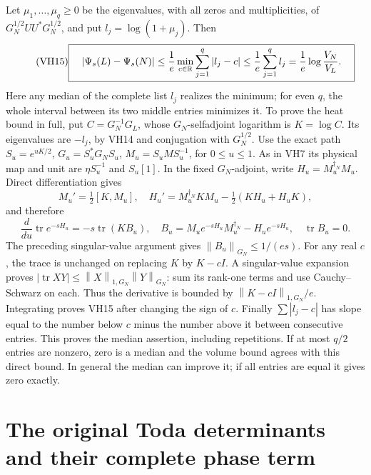 \documentclass[11pt]{article}
\newcommand{\tr}{\operatorname{tr}}\newcommand{\norm}[1]{\left\lVert#1\right\rVert}
\begin{document}
Let \(\mu_1,\ldots,\mu_q\ge0\) be the eigenvalues, with all zeros
and multiplicities, of \(G_N^{1/2}UU^*G_N^{1/2}\), and put
\(l_j=\log(1+\mu_j)\). Then
\begin{equation}\tag{VH15}\label{VH15}
\boxed{\quad
|\Psi_s(L)-\Psi_s(N)|
\le\frac1e\min_{c\in\mathbb R}\sum_{j=1}^q|l_j-c|
\le\frac1e\sum_{j=1}^q l_j
=\frac1e\log\frac{V_N}{V_L}.\quad}
\end{equation}
Here any median of the complete list \(l_j\) realizes the minimum;
for even \(q\), the whole interval between its two middle entries
minimizes it. To prove the heat bound in full, put
\(C=G_N^{-1}G_L\), whose \(G_N\)-selfadjoint logarithm is
\(K=\log C\). Its eigenvalues are \(-l_j\), by VH14 and conjugation
with \(G_N^{1/2}\). Use the exact path
\(S_u=e^{uK/2}\), \(G_u=S_u^*G_NS_u\), \(M_u=S_uMS_u^{-1}\),
for \(0\le u\le1\). As in VH7 its physical map and unit are
\(\eta S_u^{-1}\) and \(S_u[1]\).
In the fixed \(G_N\)-adjoint, write \(H_u=M_u^{\dagger_N}M_u\).
Direct differentiation gives
\[
M_u'=\tfrac12[K,M_u],\quad
H_u'=M_u^{\dagger_N}KM_u-\tfrac12(KH_u+H_uK),
\]
and therefore
\[
\frac d{du}\tr e^{-sH_u}=-s\tr(KB_u),\quad
B_u=M_u e^{-sH_u}M_u^{\dagger_N}-H_u e^{-sH_u},\quad\tr B_u=0.
\]
The preceding singular-value argument gives \(\norm{B_u}_{G_N}\le1/(es)\).
For any real \(c\), the trace is unchanged on replacing \(K\) by
\(K-cI\). A singular-value expansion proves
\(|\tr XY|\le\norm X_{1,G_N}\norm Y_{G_N}\): sum its rank-one terms
and use Cauchy--Schwarz on each. Thus the derivative is bounded by
\(\norm{K-cI}_{1,G_N}/e\). Integrating proves VH15 after changing
the sign of \(c\). Finally \(\sum|l_j-c|\) has slope equal to the
number below \(c\) minus the number above it between consecutive
entries. This proves the median assertion, including repetitions.
If at most \(q/2\) entries are nonzero, zero is a median and the
volume bound agrees with this direct bound. In general the median
can improve it; if all entries are equal it gives zero exactly.

\section{The original Toda determinants and their complete phase term}
\end{document}
